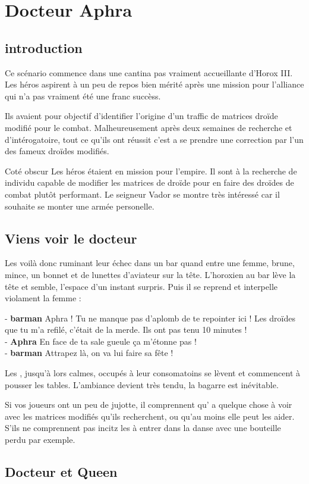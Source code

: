 \section{Docteur Aphra}

\subsection{introduction}
Ce scénario commence dans une cantina pas vraiment accueillante d’Horox III. Les héros aspirent à un peu de repos bien mérité après une mission pour l’alliance qui n’a pas vraiment été une franc succèss.

Ils avaient pour objectif d’identifier l’origine d’un traffic de matrices droïde modifié pour le combat. Malheureusement après deux semaines de recherche et d’intérogatoire, tout ce qu’ils ont réussit c’est a se prendre une correction par l’un des fameux droïdes modifiés. 

\begin{paperbox}{Coté obscur}
Les héros étaient en mission pour l’empire. Il sont à la recherche de individu capable de modifier les matrices de droïde pour en faire des droïdes de combat plutôt performant. Le seigneur Vador se montre très intéressé car il souhaite se monter une armée personelle.
\end{paperbox}

\subsection{Viens voir le docteur}
Les voilà donc ruminant leur échec dans un bar quand entre une femme, brune, mince, un bonnet et de lunettes d’aviateur sur la tête. L’horoxien au bar lève la tête et semble, l’espace d’un instant surpris. Puis il se reprend et interpelle violament la femme :

\begin{quotebox}
- \textbf{barman} Aphra ! Tu ne manque pas d’aplomb de te repointer ici ! Les droïdes que tu m’a refilé, c’était de la merde. Ils ont pas tenu 10 minutes !\\
- \textbf{Aphra} En face de ta sale gueule ça m’étonne pas !\\
- \textbf{barman} Attrapez là, on va lui faire sa fête !
\end{quotebox}

Les , jusqu’à lors calmes, occupés à leur consomatoins se lèvent et commencent à pousser les tables. L’ambiance devient très tendu, la bagarre est inévitable. 

Si vos joueurs ont un peu de jujotte, il comprennent qu’ a quelque chose à voir avec les matrices modifiés qu’ils recherchent, ou qu’au moins elle peut les aider. S’ils ne comprennent pas incitz les à entrer dans la danse avec une bouteille perdu par exemple.

\subsection{Docteur et Queen}